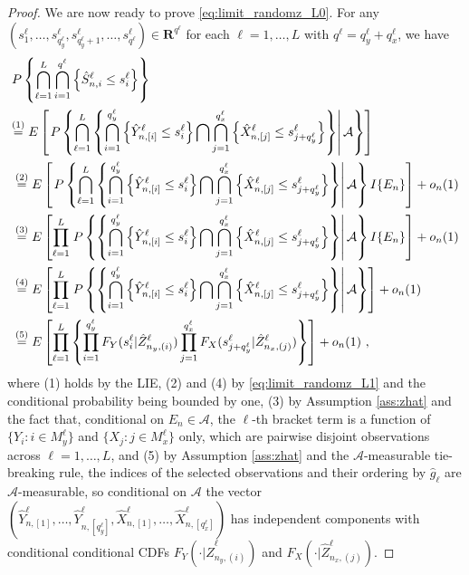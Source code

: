 \documentclass[10pt,a4paper]{amsart}
\begin{document}
\begin{proof}
  We are now ready to prove \eqref{eq:limit_randomz_L0}. For any $(s_{1}^{\ell},\dots,s_{q_{y}^{\ell}}^{\ell},s_{q_{y}^{\ell}+1}^{\ell},\dots, s_{q^{\ell}}^{\ell})\in\mathbf{R}^{q^{\ell}}$ for each $\ell=1,\dots,L$ with $q^{\ell}=q_{y}^{\ell}+q_{x}^{\ell}$, we have
  \begin{align}
  &P\left\{\bigcap_{\ell=1}^{L}\bigcap_{i=1}^{q^{\ell}}\left\{\hat S_{n,i}^{\ell}\leq
  s_{i}^{\ell}\right\}\right\}\notag\\
  &{\overset{(1)}{=}E\left[\left.P\left\{\bigcap_{\ell=1}^{L}\left\{
  \bigcap_{i=1}^{q_{y}^{\ell}}\left\{\hat Y_{n,\left[i\right]}^{\ell}\leq s_{i}^{\ell}
  \right\}\bigcap\bigcap_{j=1}^{q_{x}^{\ell}}\left\{\hat X_{n,\left[j\right]}^{\ell}\leq
  s_{j+q_{y}^{\ell}}^{\ell}\right\}\right\}\right\vert\mathcal{A}\right\}\right]}\notag\\
  &\overset{(2)}{=}E\left[\left.P\left\{\bigcap_{\ell=1}^{L}\left\{
  \bigcap_{i=1}^{q_{y}^{\ell}}\left\{\hat Y_{n,\left[i\right]}^{\ell}\leq s_{i}^{\ell}
  \right\}\bigcap\bigcap_{j=1}^{q_{x}^{\ell}}\left\{\hat X_{n,\left[j\right]}^{\ell}\leq
  s_{j+q_{y}^{\ell}}^{\ell}\right\}\right\}\right\vert\mathcal{A}\right\}I\{E_{n}\}\right]
  +o_{n}(1)\notag\\
  &\overset{(3)}{=}E\left[\prod_{\ell=1}^{L}\left.P\left\{\left\{
  \bigcap_{i=1}^{q_{y}^{\ell}}\left\{\hat Y_{n,\left[i\right]}^{\ell}\leq s_{i}^{\ell}
  \right\}\bigcap\bigcap_{j=1}^{q_{x}^{\ell}}\left\{\hat X_{n,\left[j\right]}^{\ell}\leq
  s_{j+q_{y}^{\ell}}^{\ell}\right\}\right\}\right\vert\mathcal{A}\right\}I\{E_{n}\}\right]
  +o_{n}(1)\notag\\
  &\overset{(4)}{=}E\left[\prod_{\ell=1}^{L}\left.P\left\{\left\{
  \bigcap_{i=1}^{q_{y}^{\ell}}\left\{\hat Y_{n,\left[i\right]}^{\ell}\leq s_{i}^{\ell}
  \right\}\bigcap\bigcap_{j=1}^{q_{x}^{\ell}}\left\{\hat X_{n,\left[j\right]}^{\ell}\leq
  s_{j+q_{y}^{\ell}}^{\ell}\right\}\right\}\right\vert\mathcal{A}\right\}\right]
  +o_{n}(1)\notag\\
  &\overset{(5)}{=}E\left[\prod_{\ell=1}^{L}\left\{\prod_{i=1}^{q_{y}^{\ell}}
  F_{Y}(s_{i}^{\ell}|\hat Z_{n_{y},\left(i\right)}^{\ell})\prod_{j=1}^{q_{x}^{\ell}}
  F_{X}(s_{j+q_{y}^{\ell}}^{\ell}|\hat Z_{n_{x},\left(j\right)}^{\ell})\right\}\right]+o_{n}(1)~,
  \label{eq:limit_randomz_L5}
  \end{align}
where (1) holds by the LIE, (2) and (4) by \eqref{eq:limit_randomz_L1} and the conditional probability being bounded by one, (3) by Assumption \ref{ass:zhat} and the fact that, conditional on $E_n \in \mathcal{A}$, the $\ell$-th bracket term is a function of $\{Y_i:i\in M_y^{\ell}\}$ and $\{X_j:j\in M_x^{\ell}\}$ only, which are pairwise disjoint observations across $\ell = 1,\dots,L$, and (5) by Assumption \ref{ass:zhat} and the $\mathcal A$-measurable tie-breaking rule, the indices of the selected observations and their ordering by $\hat g_\ell$ are $\mathcal A$-measurable, so conditional on $\mathcal A$ the vector $(\hat Y_{n,[1]}^{\ell},\dots,\hat Y_{n,[q_y^\ell]}^{\ell}, \hat X_{n,[1]}^{\ell},\dots,\hat X_{n,[q_x^\ell]}^{\ell})$ has independent components with conditional conditional CDFs $F_{Y}(\cdot|\hat Z_{n_{y},(i)}^{\ell})$ and $F_{X}(\cdot|\hat Z_{n_{x},(j)}^{\ell})$.


\end{proof}
\end{document}
